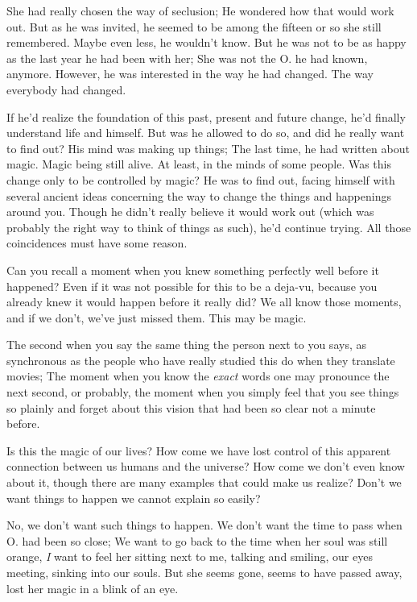 She had really chosen the way of seclusion; He wondered how that would work out. But as he was invited, he seemed to be among the fifteen or so she still remembered. Maybe even less, he wouldn't know. 
But he was not to be as happy as the last year he had been with her; She was not the O. he had known, anymore. However, he was interested in the way he had changed. 
The way everybody had changed.

If he'd realize the foundation of this past, present and future change, he'd finally understand life and himself. But was he allowed to do so, and did he really want to find out? 
His mind was making up things; The last time, he had written about magic. Magic being still alive. At least, in the minds of some people. Was this change only to be controlled by magic? He was to find out, facing himself with several ancient ideas concerning the way to change the things and happenings around you. Though he didn't really believe it would work out (which was probably the right way to think of things as such), he'd continue trying. All those coincidences must have some reason.

Can you recall a moment when you knew something perfectly well before it happened? Even if it was not possible for this to be a deja-vu, because you already knew it would happen before it really did? 
We all know those moments, and if we don't, we've just missed them. This may be magic.

The second when you say the same thing the person next to you says, as synchronous as the people who have really studied this do when they translate movies; The moment when you know the \emph{exact} words one may pronounce the next second, or probably, the moment when you simply feel that you see things so plainly and forget about this vision that had been so clear not a minute before.

Is this the magic of our lives? How come we have lost control of this apparent connection between us humans and the universe?
How come we don't even know about it, though there are many examples that could make us realize? Don't we want things to happen we cannot explain so easily?

No, we don't want such things to happen. We don't want the time to pass when O. had been so close; We want to go back to the time when her soul was still orange, \emph{I} want to feel her sitting next to me, talking and smiling, our eyes meeting, sinking into our souls. But she seems gone, seems to have passed away, lost her magic in a blink of an eye.

